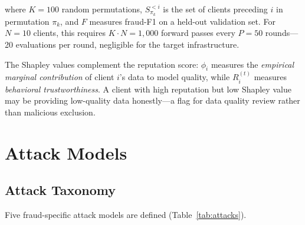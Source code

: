 \documentclass[10pt,journal]{IEEEtran}
\begin{document}
where $K=100$ random permutations, $S_{\pi_k}^{<i}$ is the set of clients preceding $i$ in permutation $\pi_k$, and $F$ measures fraud-F1 on a held-out validation set. For $N=10$ clients, this requires $K \cdot N = 1{,}000$ forward passes every $P=50$ rounds---20 evaluations per round, negligible for the target infrastructure.

The Shapley values complement the reputation score: $\phi_i$ measures the \emph{empirical marginal contribution} of client $i$'s data to model quality, while $R_i^{(t)}$ measures \emph{behavioral trustworthiness}. A client with high reputation but low Shapley value may be providing low-quality data honestly---a flag for data quality review rather than malicious exclusion.

\section{Attack Models}
\label{sec:attacks}

\subsection{Attack Taxonomy}

Five fraud-specific attack models are defined (Table~\ref{tab:attacks}).

\begin{table}[t]
\centering
\caption{Attack model taxonomy.}
\label{tab:attacks}
\footnotesize
{}
\end{table}
\end{document}
